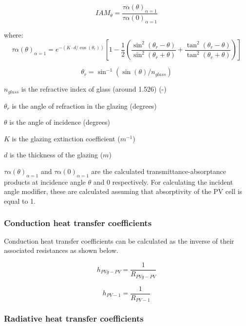 {\begin{equation}
IAM_{\theta}=\frac{\tau\alpha(\theta)_{\alpha=1}}{\tau\alpha(0)_{\alpha=1}}
\label{eq:BIPVT-IAM}
\end{equation}

where:
\begin{equation}
\tau\alpha(\theta)_{\alpha=1}=e^{-\left(K\cdot d/\cos\left(\theta_{r}\right)\right)}\left[1-\frac{1}{2}\left(\frac{\sin^{2}(\theta_{r}-\theta)}{\sin^{2}(\theta_{r}+\theta)}+\frac{\tan^{2}(\theta_{r}-\theta)}{\tan^{2}(\theta_{r}+\theta)}\right)\right]
\label{eq:BIPVT-IAM-2}
\end{equation}

\begin{equation}
\theta_{r}=\sin^{-1}\left(\sin(\theta)/n_{glass}\right)
\label{eq:BIPVT-theta-r}
\end{equation}

\(n_{glass}\) is the refractive index of glass (around 1.526) (-)

\(\theta_{r}\) is the angle of refraction in the glazing (degrees)

\(\theta\) is the angle of incidence (degrees)

\(K\) is the glazing extinction coefficient (\(m^{-1}\))

\(d\) is the thickness of the glazing (\(m\))

\(\tau\alpha(\theta)_{\alpha=1}\) and \(\tau\alpha(0)_{\alpha=1}\) are the calculated transmittance-absorptance products at incidence angle \(\theta\) and 0 respectively. For calculating the incident angle modifier, these are calculated assuming that absorptivity of the PV cell is equal to 1.

\subsubsection{Conduction heat transfer coefficients}\label{BIPVT-htc-c}

Conduction heat transfer coefficients can be calculated as the inverse of their associated resistances as shown below.

\begin{equation}
h_{PVg-PV}=\frac{1}{R_{PVg-PV}}
\label{eq:BIPVT-h-glass-cell}
\end{equation}

\begin{equation}
h_{PV-1}=\frac{1}{R_{PV-1}}
\label{eq:BIPVT-h-cell-1}
\end{equation}

\subsubsection{Radiative heat transfer coefficients}\label{BIPVT-htc-r}

}
